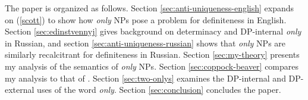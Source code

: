 The paper is organized as follows. Section \ref{sec:anti-uniqueness-english} expands on (\ref{scott}) to show how \textit{only} NPs pose a problem for definiteness in English. Section \ref{sec:edinstvennyj} gives background on determinacy and DP-internal \textit{only} in Russian, and section \ref{sec:anti-uniqueness-russian} shows that \textit{only} NPs are similarly recalcitrant for definiteness in Russian. Section \ref{sec:my-theory} presents my analysis of the semantics of \textit{only} NPs. Section \ref{sec:coppock-beaver} compares my analysis to that of \citet{cb2015}. Section \ref{sec:two-onlys} examines the DP-internal and DP-external uses of the word \textit{only}. Section \ref{sec:conclusion} concludes the paper.